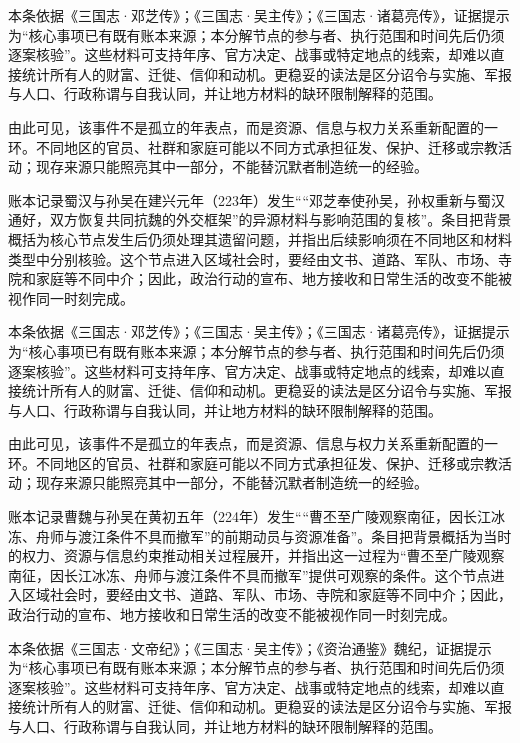 本条依据《三国志·邓芝传》；《三国志·吴主传》；《三国志·诸葛亮传》，证据提示为“核心事项已有既有账本来源；本分解节点的参与者、执行范围和时间先后仍须逐案核验”。这些材料可支持年序、官方决定、战事或特定地点的线索，却难以直接统计所有人的财富、迁徙、信仰和动机。更稳妥的读法是区分诏令与实施、军报与人口、行政称谓与自我认同，并让地方材料的缺环限制解释的范围。

由此可见，该事件不是孤立的年表点，而是资源、信息与权力关系重新配置的一环。不同地区的官员、社群和家庭可能以不同方式承担征发、保护、迁移或宗教活动；现存来源只能照亮其中一部分，不能替沉默者制造统一的经验。

账本记录蜀汉与孙吴在建兴元年（223年）发生““邓芝奉使孙吴，孙权重新与蜀汉通好，双方恢复共同抗魏的外交框架”的异源材料与影响范围的复核”。条目把背景概括为核心节点发生后仍须处理其遗留问题，并指出后续影响须在不同地区和材料类型中分别核验。这个节点进入区域社会时，要经由文书、道路、军队、市场、寺院和家庭等不同中介；因此，政治行动的宣布、地方接收和日常生活的改变不能被视作同一时刻完成。

本条依据《三国志·邓芝传》；《三国志·吴主传》；《三国志·诸葛亮传》，证据提示为“核心事项已有既有账本来源；本分解节点的参与者、执行范围和时间先后仍须逐案核验”。这些材料可支持年序、官方决定、战事或特定地点的线索，却难以直接统计所有人的财富、迁徙、信仰和动机。更稳妥的读法是区分诏令与实施、军报与人口、行政称谓与自我认同，并让地方材料的缺环限制解释的范围。

由此可见，该事件不是孤立的年表点，而是资源、信息与权力关系重新配置的一环。不同地区的官员、社群和家庭可能以不同方式承担征发、保护、迁移或宗教活动；现存来源只能照亮其中一部分，不能替沉默者制造统一的经验。

账本记录曹魏与孙吴在黄初五年（224年）发生““曹丕至广陵观察南征，因长江冰冻、舟师与渡江条件不具而撤军”的前期动员与资源准备”。条目把背景概括为当时的权力、资源与信息约束推动相关过程展开，并指出这一过程为“曹丕至广陵观察南征，因长江冰冻、舟师与渡江条件不具而撤军”提供可观察的条件。这个节点进入区域社会时，要经由文书、道路、军队、市场、寺院和家庭等不同中介；因此，政治行动的宣布、地方接收和日常生活的改变不能被视作同一时刻完成。

本条依据《三国志·文帝纪》；《三国志·吴主传》；《资治通鉴》魏纪，证据提示为“核心事项已有既有账本来源；本分解节点的参与者、执行范围和时间先后仍须逐案核验”。这些材料可支持年序、官方决定、战事或特定地点的线索，却难以直接统计所有人的财富、迁徙、信仰和动机。更稳妥的读法是区分诏令与实施、军报与人口、行政称谓与自我认同，并让地方材料的缺环限制解释的范围。

